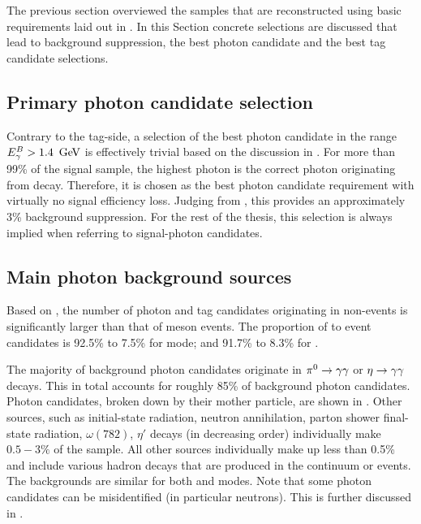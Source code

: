 The previous section overviewed the samples that are reconstructed using basic requirements laid out in .
In this Section concrete selections are discussed that lead to background suppression, the best photon candidate
and the best tag candidate selections.

\subsection{Primary photon candidate selection}\label{sec:primary_photon_candidate_selection}
Contrary to the tag-side, a selection of the best photon candidate in the range ${E^B_{\gamma}}>1.4~\mathrm{\,Ge\kern -0.1em V}$ 
is effectively trivial based on the discussion in .
For more than 99\% of the signal \MC sample, the highest \EB photon 
is the correct photon originating from \BtoXsgamma decay.
Therefore, it is chosen as the best photon candidate requirement with virtually no signal efficiency loss.
Judging from , this provides an approximately 3\% background suppression.
For the rest of the thesis, this selection is always implied when referring to signal-photon candidates.

\subsection{Main photon background sources}\label{sec:main_background_sources}

Based on , the number of photon and tag candidates originating 
in non-\BB events is significantly larger than that of \B meson events.
The proportion of \qqbar to \BB event candidates is 92.5\% to 7.5\% for \feiBp mode;
and 91.7\% to 8.3\% for \feiBz.

The majority of background photon candidates originate in $\pi^0\rightarrow\gamma\gamma$ or $\eta\rightarrow\gamma\gamma$ decays.
This in total accounts for roughly 85\% of background photon candidates.
Photon candidates, broken down by their mother particle, are shown in .
Other sources, such as initial-state radiation, neutron annihilation, parton shower final-state radiation, $\omega(782)$, $\eta'$ decays (in decreasing order) individually make $0.5-3\%$ of the sample.
All other sources individually make up less than 0.5\% and include various hadron decays that are produced in the continuum or \B events.
The backgrounds are similar for both \feiBp and \feiBz modes.
Note that some photon candidates can be misidentified (in particular neutrons). 
This is further discussed in .

